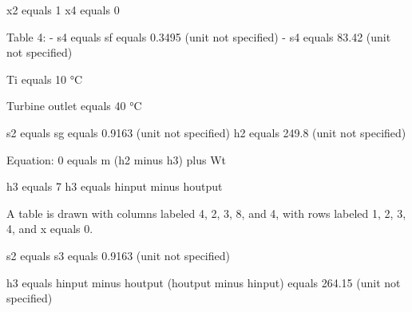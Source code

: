 x2 equals 1
x4 equals 0

Table 4:
- s4 equals sf equals 0.3495 (unit not specified)
- s4 equals 83.42 (unit not specified)

Ti equals 10 °C

Turbine outlet equals 40 °C

s2 equals sg equals 0.9163 (unit not specified)
h2 equals 249.8 (unit not specified)

Equation: 0 equals m (h2 minus h3) plus Wt

h3 equals 7
h3 equals hinput minus houtput

A table is drawn with columns labeled 4, 2, 3, 8, and 4, with rows labeled 1, 2, 3, 4, and x equals 0.

s2 equals s3 equals 0.9163 (unit not specified)

h3 equals hinput minus houtput (houtput minus hinput) equals 264.15 (unit not specified)